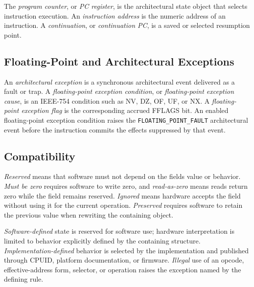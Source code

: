 The \emph{program counter}, or \emph{PC register}, is the architectural state object that selects instruction
execution. An \emph{instruction address} is the numeric address of an instruction. A \emph{continuation}, or
\emph{continuation PC}, is a saved or selected resumption point.

\subsection{Floating-Point and Architectural Exceptions}

An \emph{architectural exception} is a synchronous architectural event delivered as a fault or trap. A
\emph{floating-point exception condition}, or \emph{floating-point exception cause}, is an IEEE-754 condition such
as NV, DZ, OF, UF, or NX. A \emph{floating-point exception flag} is the corresponding accrued FFLAGS bit. An enabled
floating-point exception condition raises the \texttt{FLOATING\_POINT\_FAULT} architectural event before the
instruction commits the effects suppressed by that event.

\subsection{Compatibility}\label{section:compatibility-terminology}

\emph{Reserved} means that software must not depend on the field\textquotesingle{}s value or behavior. \emph{Must be zero} requires
software to write zero, and \emph{read-as-zero} means reads return zero while the field remains reserved.
\emph{Ignored} means hardware accepts the field without using it for the current operation. \emph{Preserved}
requires software to retain the previous value when rewriting the containing object.

\emph{Software-defined} state is reserved for software use; hardware interpretation is limited to behavior
explicitly defined by the containing structure. \emph{Implementation-defined} behavior is selected by the
implementation and published through CPUID, platform documentation, or firmware. \emph{Illegal} use of an opcode,
effective-address form, selector, or operation raises the exception named by the defining rule.
